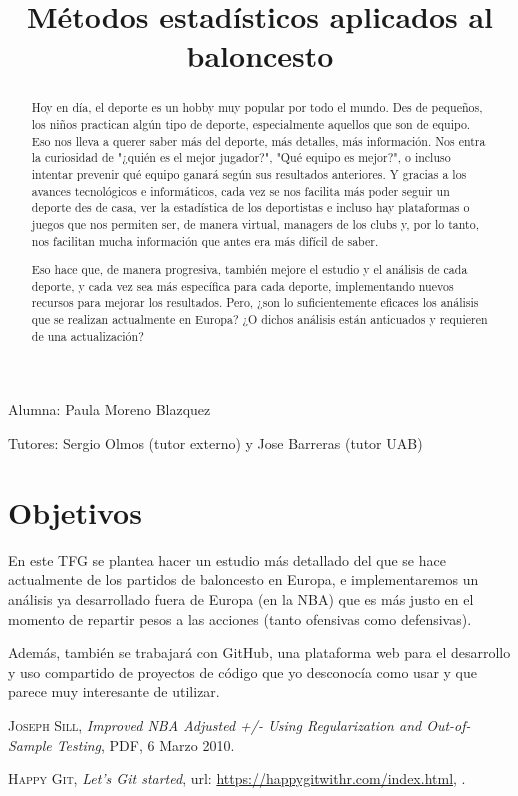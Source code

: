 \documentclass[paper=a4, fontsize=9pt]{article}
\title{\textbf{Métodos estadísticos aplicados al baloncesto}}
\date{}
\begin{document}
\maketitle

Alumna: Paula Moreno Blazquez 

Tutores: Sergio Olmos (tutor externo) y Jose Barreras (tutor UAB)

\begin{abstract}

Hoy en día, el deporte es un hobby muy popular por todo el mundo. Des de pequeños, los niños practican algún tipo de deporte, especialmente aquellos que son de equipo. Eso nos lleva a querer saber más del deporte, más detalles, más información. Nos entra la curiosidad de "¿quién es el mejor jugador?", "Qué equipo es mejor?", o incluso intentar prevenir qué equipo ganará según sus resultados anteriores. Y gracias a los avances tecnológicos e informáticos, cada vez se nos facilita más poder seguir un deporte des de casa, ver la estadística de los deportistas e incluso hay plataformas o juegos que nos permiten ser, de manera virtual, managers de los clubs y, por lo tanto, nos facilitan mucha información que antes era más difícil de saber.

Eso hace que, de manera progresiva, también mejore el estudio y el análisis de cada deporte, y cada vez sea más específica para cada deporte, implementando nuevos recursos para mejorar los resultados. Pero, ¿son lo suficientemente eficaces los análisis que se realizan actualmente en Europa? ¿O dichos análisis están anticuados y requieren de una actualización?

\end{abstract}

\section*{Objetivos}
En este TFG se plantea hacer un estudio más detallado del que se hace actualmente de los partidos de baloncesto en Europa, e implementaremos un análisis ya desarrollado fuera de Europa (en la NBA) que es más justo en el momento de repartir pesos a las acciones (tanto ofensivas como defensivas).

Además, también se trabajará con GitHub, una plataforma web para el desarrollo y uso compartido de proyectos de código que yo desconocía como usar y que parece muy interesante de utilizar.

\begin{thebibliography}{X}
	 \textsc{Joseph Sill}, \textit{Improved NBA Adjusted +/- Using Regularization and Out-of-Sample Testing}, PDF, 6 Marzo 2010.
	
	 \textsc{Happy Git}, \textit{Let’s Git started}, url: \url{https://happygitwithr.com/index.html}, .
\end{thebibliography}
\end{document}
